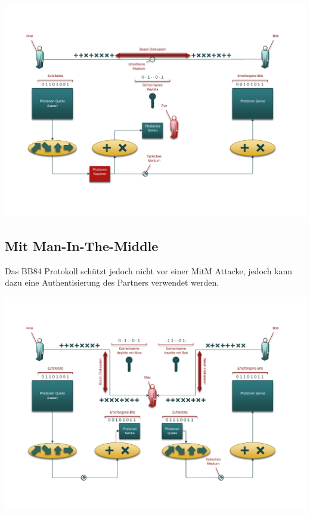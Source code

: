   \includegraphics[width=\textwidth]{crypto/BB84Eve-Clone.pdf}

  \subsection{Mit Man-In-The-Middle}
  Das BB84 Protokoll sch\"utzt jedoch nicht vor einer MitM Attacke,
  jedoch kann dazu eine Authentisierung des Partners verwendet werden.\cite{qc:Authentisierung}

  \includegraphics[width=\textwidth]{crypto/BB84Max.pdf}

